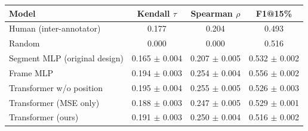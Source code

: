 \begin{tabular}{lccc}
\toprule
Model & Kendall $\tau$ & Spearman $\rho$ & F1@15\% \\
\midrule
Human (inter-annotator) & 0.177 & 0.204 & 0.493 \\
Random & 0.000 & 0.000 & 0.516 \\
Segment MLP (original design) & 0.165 $\pm$ 0.004 & 0.207 $\pm$ 0.005 & 0.532 $\pm$ 0.002 \\
Frame MLP & 0.194 $\pm$ 0.003 & 0.254 $\pm$ 0.004 & 0.556 $\pm$ 0.002 \\
Transformer w/o position & 0.195 $\pm$ 0.004 & 0.255 $\pm$ 0.005 & 0.526 $\pm$ 0.003 \\
Transformer (MSE only) & 0.188 $\pm$ 0.003 & 0.247 $\pm$ 0.005 & 0.529 $\pm$ 0.001 \\
Transformer (ours) & 0.191 $\pm$ 0.003 & 0.250 $\pm$ 0.004 & 0.516 $\pm$ 0.002 \\
\bottomrule
\end{tabular}
